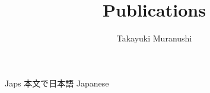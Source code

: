 \documentclass{article}
\title{Publications}
\author{Takayuki Muranushi}
\begin{document}
\begin{CJK}{UTF8}{min}

\maketitle

\begin{bibunit}[custom2]
  \nocite{*}

  Japs 本文で日本語 Japanese

  \renewcommand\refname{Books}
  \putbib[books]
\end{bibunit}


\begin{bibunit}[custom2]
  \nocite{*}

  \renewcommand\refname{Peer-reviewed Publications}
  \putbib[publications]
\end{bibunit}

\end{CJK}
\end{document}
